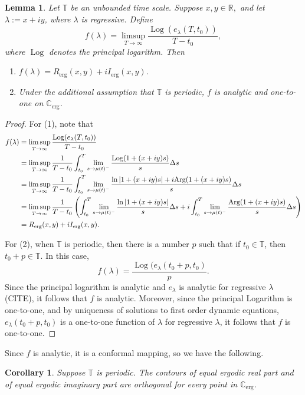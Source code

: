 \documentclass[reqno]{amsart}
\theoremstyle{plain}
\newtheorem{corollary}[theorem]{Corollary}
\newtheorem{lemma}[theorem]{Lemma}
\theoremstyle{definition}
\numberwithin{theorem}{section}
\numberwithin{definition}{section}
\numberwithin{prop}{section}
\numberwithin{example}{section}
\newcommand{\Cerg}{\ensuremath{\mathbb{C}_{\text{erg}}}}
\newcommand{\Rerg}{\ensuremath{R_{\text{erg}}}}
\newcommand{\Ierg}{\ensuremath{I_{\text{erg}}}}
\DeclareMathOperator{\Log}{Log}
\begin{document}
\begin{lemma}
\label{lem:analytic}
Let $\mathbb{T}$ be an unbounded time scale. Suppose $x,y \in \mathbb{R},$ and let $\lambda := x+iy$, where $\lambda$ is regressive. Define $$f(\lambda) = \limsup_{T \rightarrow \infty} \frac{\Log(e_{\lambda}(T,t_0))}{T-t_0},$$ where $\Log$ denotes the principal logarithm. Then
\begin{enumerate}
    \item $f(\lambda) = \Rerg(x,y) + i \Ierg(x,y).$
    \item Under the additional assumption that $\mathbb{T}$ is periodic, $f$ is analytic and one-to-one on $\Cerg$.
\end{enumerate} 
\end{lemma}
\begin{proof}
For (1), note that
\begin{align*}
f(\lambda) & = \limsup_{T \rightarrow \infty} \frac{\Log(e_{\lambda}(T,t_0))}{T-t_0} \\
        & = \limsup_{T \rightarrow \infty} {1\over T-t_0} \int_{t_0}^{T} \lim_{s \rightarrow \mu(t)^{-}} \frac{\Log (1+(x+iy)s)}{s} \Delta s \\
& = \limsup_{T \rightarrow \infty} {1\over T-t_0}\int_{t_0}^{T} \lim_{s \rightarrow \mu(t)^{-}} \frac{\ln|1+(x+iy)s| + i \text{Arg}(1+(x+iy)s)}{s} \Delta s \\
& = \limsup_{T \rightarrow \infty} {1\over T-t_0}\left(\int_{t_0}^{T} \lim_{s \rightarrow \mu(t)^{-}} \frac{\ln|1+(x+iy)s|}{s} \Delta s +  i \int_{t_0}^{T} \lim_{s \rightarrow \mu(t)^{-}}\frac{\text{Arg}(1+(x+iy)s)}{s} \Delta s\right) \\
& = \Rerg(x,y)+i\Ierg(x,y).
\end{align*}

For (2), when $\mathbb{T}$ is periodic, then there is a number $p$ such that if $t_0 \in \mathbb{T}$, then $t_0 +p \in \mathbb{T}.$ In this case,
$$
f(\lambda) = \frac{\Log(e_{\lambda}(t_0+p,t_0)}{p}.
$$
Since the principal logarithm is analytic and $e_{\lambda}$ is analytic for regressive $\lambda$ (CITE), it follows that $f$ is analytic. Moreover, since the principal Logarithm is one-to-one, and by uniqueness of solutions to first order dynamic equations, $e_{\lambda}(t_0+p,t_0)$ is a one-to-one function of $\lambda$ for regressive $\lambda$, it follows that $f$ is one-to-one.
\end{proof}

Since $f$ is analytic, it is a conformal mapping, so we have the following.
\begin{corollary}
Suppose $\mathbb{T}$ is periodic. The contours of equal ergodic real part and of equal ergodic imaginary part are orthogonal for every point in $\Cerg$.
\end{corollary}
\end{document}
